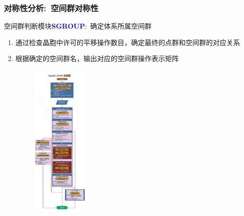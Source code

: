 \documentclass[cjk,slidestop,handout,compress,mathserif,blue]{beamer}	%
\begin{document}
\frame
{
	\frametitle{对称性分析:~空间群对称性}
\begin{minipage}[b]{0.52\linewidth}
	空间群判断模块\textcolor{blue}{\textbf{SGROUP}}:~确定体系所属空间群
	\begin{enumerate}
		\item 通过检查晶胞中许可的平移操作数目，确定最终的点群和空间群的对应关系\\
			{\fontsize{7.2pt}{4.2pt}\selectfont{(32点群-230空间群对应列表)}}
		\item 根据确定的空间群名，输出对应的空间群操作表示矩阵\\{\fontsize{7.2pt}{4.2pt}\selectfont{(点群矩阵+平移矢量)}}
	\end{enumerate}
\end{minipage}
\hfill
\begin{minipage}[b]{0.46\linewidth}
\begin{figure}[h!]
\centering
\vspace*{-0.2in}
\includegraphics[height=3.05in,width=1.55in,viewport=0 50 840 2255,clip]{Figures/VASP_sym-detail.png}
\label{Space_Symmetry}
\end{figure} 
\end{minipage}
}
\end{document}
